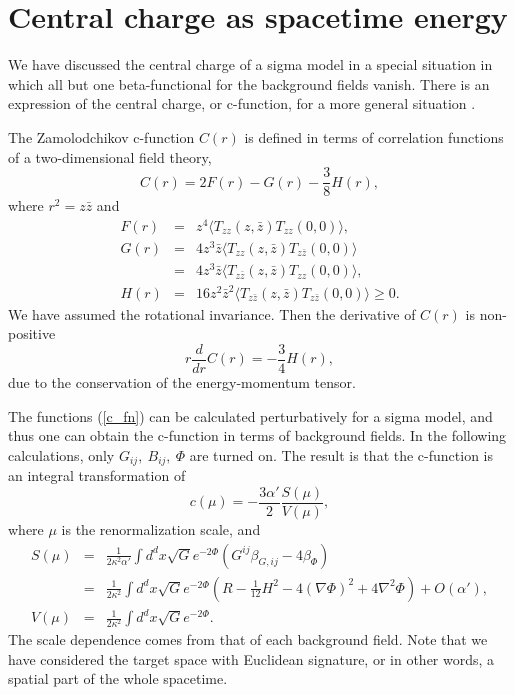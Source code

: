 \documentclass[a4paper,a4paper]{article}
\begin{document}
\vspace{1cm}

\section{Central charge as spacetime energy} \label{center}

\vspace{5mm}

We have discussed the central charge of a sigma model in a special situation in which all but one beta-functional 
for the background fields vanish. 
There is an expression of the central charge, or c-function, for a more general situation \cite{Tseytlin}. 

The Zamolodchikov c-function $C(r)$ is defined in terms of correlation functions of a two-dimensional field theory, 
\begin{equation}
C(r) = 2F(r)-G(r)-\frac38H(r),
\end{equation}
where $r^2=z\bar{z}$ and 
\begin{eqnarray}
F(r) &=& z^4\langle T_{zz}(z,\bar{z})T_{zz}(0,0)\rangle, \nonumber \\
G(r) &=& 4z^3\bar{z}\langle T_{zz}(z,\bar{z})T_{z\bar{z}}(0,0)\rangle \nonumber \\
     &=& 4z^3\bar{z}\langle T_{z\bar{z}}(z,\bar{z})T_{zz}(0,0)\rangle, 
          \label{c_fn}\\
H(r) &=& 16z^2\bar{z}^2\langle T_{z\bar{z}}(z,\bar{z})T_{z\bar{z}}(0,0)\rangle\ge 0. \nonumber 
\end{eqnarray}
We have assumed the rotational invariance. 
Then the derivative of $C(r)$ is non-positive
\begin{equation}
r\frac d{dr}C(r) = -\frac34H(r),
\end{equation}
due to the conservation of the energy-momentum tensor. 

The functions (\ref{c_fn}) can be calculated perturbatively for a sigma model, and thus one can obtain the 
c-function in terms of background fields. 
In the following calculations, only $G_{ij},\ B_{ij},\ \Phi$ are turned on. 
The result \cite{Tseytlin}\cite{GHMS} is that the c-function is an integral transformation of 
\begin{equation}
c(\mu) = -\frac{3\alpha'}2\frac{S(\mu)}{V(\mu)},
    \label{c=action}
\end{equation}
where $\mu$ is the renormalization scale, and 
\begin{eqnarray}
S(\mu) &=& \frac1{2\kappa^2\alpha'}\int d^dx\sqrt{G}e^{-2\Phi}(G^{ij}\beta_{G,ij}-4\beta_\Phi) \nonumber \\
       &=& \frac1{2\kappa^2}\int d^dx\sqrt{G}e^{-2\Phi}\left(R-\frac1{12}H^2-4(\nabla\Phi)^2+4\nabla^2\Phi\right)
          +O(\alpha'), 
   \label{action} \\
V(\mu) &=& \frac1{2\kappa^2}\int d^dx\sqrt{G}e^{-2\Phi}. 
\end{eqnarray}
The scale dependence comes from that of each background field. 
Note that we have considered the target space with Euclidean signature, or in other words, a spatial part of the 
whole spacetime. 
\end{document}

